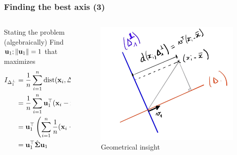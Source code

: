 \documentclass{beamer}\usepackage[]{graphicx}\usepackage[]{color}
\begin{document}
\begin{frame}
  \frametitle{Finding the best axis (3)}

\begin{columns}
  \begin{column}{.5\textwidth}
  \begin{block}{Stating the problem (algebraically)}
    Find $\mathbf{u}_1; \|\mathbf{u}_1 \|=1$ that maximizes
    \begin{equation*}
      \begin{aligned}
        I_{\Delta_1^\bot} & = \frac{1}{n}\sum_{i=1}^n \text{dist}(\mathbf{x}_i,\Delta_1^\bot)^2 \\ 
        & = \frac{1}{n}\sum_{i=1}^n \mathbf{u}_1^\top (\mathbf{x}_i - \bar{\mathbf{x}})(\mathbf{x}_i - \bar{\mathbf{x}})^\top \mathbf{u}_1 \\
        & = \mathbf{u}_1^\top \left( \sum_{i=1}^n \frac{1}{n}(\mathbf{x}_i - \bar{\mathbf{x}})(\mathbf{x}_i - \bar{\mathbf{x}})^\top \right)  \mathbf{u}_1 \\
        & = \mathbf{u}_1^\top \hat{\boldsymbol{\Sigma}}  \mathbf{u}_1
      \end{aligned}
    \end{equation*} 
  \end{block}  
  \end{column}
  \begin{column}{.45\textwidth}
  \begin{figure}
    \includegraphics[width=.9\textwidth]{solving_inertia}
    \caption{Geometrical insight}
  \end{figure}
  \end{column}
\end{columns}
  
\end{frame}
\end{document}
